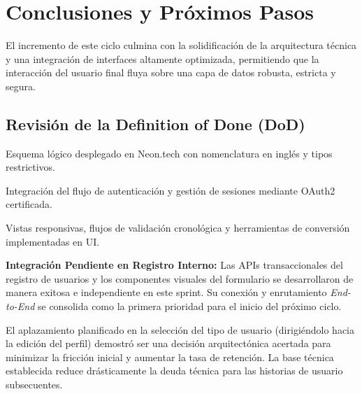 \section{Conclusiones y Próximos Pasos}
\label{sec:conclusiones}

El incremento de este ciclo culmina con la solidificación de la arquitectura técnica y una integración de interfaces altamente optimizada, permitiendo que la interacción del usuario final fluya sobre una capa de datos robusta, estricta y segura.

\subsection{Revisión de la Definition of Done (DoD)}
\begin{ChecklistDoD}
    \item Esquema lógico desplegado en Neon.tech con nomenclatura en inglés y tipos restrictivos.
    \item Integración del flujo de autenticación y gestión de sesiones mediante OAuth2 certificada.
    \item Vistas responsivas, flujos de validación cronológica y herramientas de conversión implementadas en UI.
\end{ChecklistDoD}

\vspace{0.5cm}

\begin{AlertaDefecto}
\textbf{Integración Pendiente en Registro Interno:} Las APIs transaccionales del registro de usuarios y los componentes visuales del formulario se desarrollaron de manera exitosa e independiente en este sprint. Su conexión y enrutamiento \textit{End-to-End} se consolida como la primera prioridad para el inicio del próximo ciclo.
\end{AlertaDefecto}

El aplazamiento planificado en la selección del tipo de usuario (dirigiéndolo hacia la edición del perfil) demostró ser una decisión arquitectónica acertada para minimizar la fricción inicial y aumentar la tasa de retención. La base técnica establecida reduce drásticamente la deuda técnica para las historias de usuario subsecuentes.